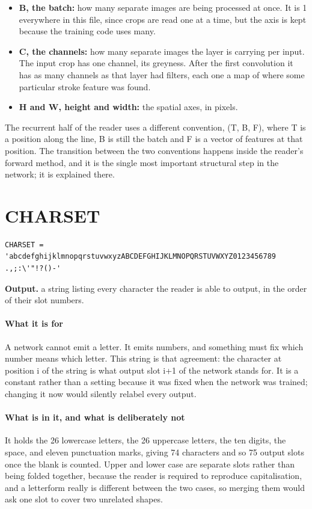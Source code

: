 \begin{itemize}\setlength\itemsep{0pt}
  \item \textbf{B, the batch:} how many separate images are being processed at once. It is 1 everywhere in this file, since crops are read one at a time, but the axis is kept because the training code uses many.
  \item \textbf{C, the channels:} how many separate images the layer is carrying per input. The input crop has one channel, its greyness. After the first convolution it has as many channels as that layer had filters, each one a map of where some particular stroke feature was found.
  \item \textbf{H and W, height and width:} the spatial axes, in pixels.
\end{itemize}
The recurrent half of the reader uses a different convention, (T, B, F), where T is a position along the line, B is still the batch and F is a vector of features at that position. The transition between the two conventions happens inside the reader's forward method, and it is the single most important structural step in the network; it is explained there.


\section{CHARSET}
\begin{lstlisting}[style=sig]
CHARSET = 'abcdefghijklmnopqrstuvwxyzABCDEFGHIJKLMNOPQRSTUVWXYZ0123456789 .,;:\'"!?()-'
\end{lstlisting}

\noindent\textbf{Output.} a string listing every character the reader is able to output, in the order of their slot numbers.


\paragraph{What it is for}
A network cannot emit a letter. It emits numbers, and something must fix which number means which letter. This string is that agreement: the character at position i of the string is what output slot i+1 of the network stands for. It is a constant rather than a setting because it was fixed when the network was trained; changing it now would silently relabel every output.


\paragraph{What is in it, and what is deliberately not}
It holds the 26 lowercase letters, the 26 uppercase letters, the ten digits, the space, and eleven punctuation marks, giving 74 characters and so 75 output slots once the blank is counted. Upper and lower case are separate slots rather than being folded together, because the reader is required to reproduce capitalisation, and a letterform really is different between the two cases, so merging them would ask one slot to cover two unrelated shapes.


